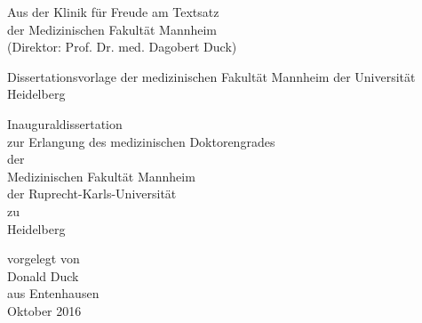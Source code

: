 \documentclass{scrreprt}
\begin{document}
\begin{titlepage}
\vspace*{\fill} %

	\begin{center}
	Aus der Klinik für Freude am Textsatz\\
	der Medizinischen Fakultät Mannheim\\
	(Direktor: Prof. Dr. med. Dagobert Duck)\\
	
	\end{center}

	\vspace{26mm}

	\begin{center}
		\begin{Large}
Dissertationsvorlage der medizinischen Fakultät Mannheim der Universität Heidelberg\\
		\end{Large}
	\end{center}

	\vspace{26mm}

	\begin{center}
	Inauguraldissertation\\
	zur Erlangung des medizinischen Doktorengrades\\
	der\\
	Medizinischen Fakultät Mannheim\\
	der Ruprecht-Karls-Universität\\ 
	zu\\
	Heidelberg\\
	\end{center}

	\vspace{30mm}

	\begin{center}
	vorgelegt von\\
	Donald Duck\\
	aus Entenhausen\\ 
	\bigskip
	Oktober 2016\\
	\end{center}
\end{titlepage}
\end{document}

